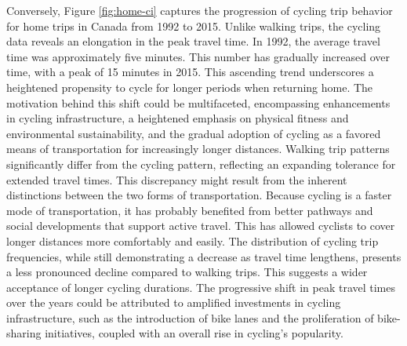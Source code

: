 \documentclass[
11pt, %
oneside, %
english, %
singlespacing, %
]{macthesis} %
\begin{document}
Conversely, Figure \ref{fig:home-ci} captures the progression of cycling trip behavior for home trips in Canada from 1992 to 2015. Unlike walking trips, the cycling data reveals an elongation in the peak travel time. In 1992, the average travel time was approximately five minutes. This number has gradually increased over time, with a peak of 15 minutes in 2015. This ascending trend underscores a heightened propensity to cycle for longer periods when returning home. The motivation behind this shift could be multifaceted, encompassing enhancements in cycling infrastructure, a heightened emphasis on physical fitness and environmental sustainability, and the gradual adoption of cycling as a favored means of transportation for increasingly longer distances. Walking trip patterns significantly differ from the cycling pattern, reflecting an expanding tolerance for extended travel times. This discrepancy might result from the inherent distinctions between the two forms of transportation. Because cycling is a faster mode of transportation, it has probably benefited from better pathways and social developments that support active travel. This has allowed cyclists to cover longer distances more comfortably and easily. The distribution of cycling trip frequencies, while still demonstrating a decrease as travel time lengthens, presents a less pronounced decline compared to walking trips. This suggests a wider acceptance of longer cycling durations. The progressive shift in peak travel times over the years could be attributed to amplified investments in cycling infrastructure, such as the introduction of bike lanes and the proliferation of bike-sharing initiatives, coupled with an overall rise in cycling's popularity.
\end{document}
